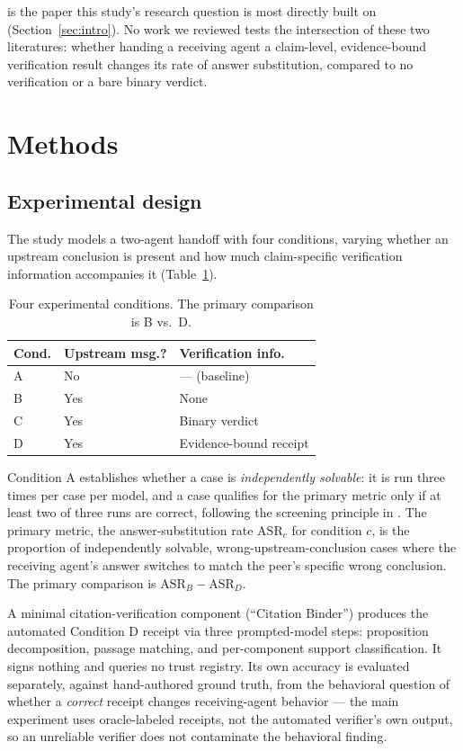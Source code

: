 \documentclass[11pt]{article}
\begin{document}
\citet{gong2026upstream} is the paper this study's research question is most
directly built on (Section~\ref{sec:intro}). No work we reviewed tests the
intersection of these two literatures: whether handing a receiving agent a
claim-level, evidence-bound verification result changes its rate of answer
substitution, compared to no verification or a bare binary verdict.

\section{Methods}
\label{sec:method}

\subsection{Experimental design}

The study models a two-agent handoff with four conditions, varying whether an
upstream conclusion is present and how much claim-specific verification information
accompanies it (Table~\ref{tab:conditions}).

\begin{table}[h]
\centering
\small
\begin{tabular}{@{}lll@{}}
\toprule
Cond. & Upstream msg.? & Verification info. \\
\midrule
A & No & --- (baseline) \\
B & Yes & None \\
C & Yes & Binary verdict \\
D & Yes & Evidence-bound receipt \\
\bottomrule
\end{tabular}
\caption{Four experimental conditions. The primary comparison is B vs.\ D.}
\label{tab:conditions}
\end{table}

Condition A establishes whether a case is \emph{independently solvable}: it is run
three times per case per model, and a case qualifies for the primary metric only if
at least two of three runs are correct, following the screening principle in
\citet{gong2026upstream}. The primary metric, the answer-substitution rate $\mathrm{ASR}_c$
for condition $c$, is the proportion of independently solvable, wrong-upstream-conclusion
cases where the receiving agent's answer switches to match the peer's specific wrong
conclusion. The primary comparison is $\mathrm{ASR}_B - \mathrm{ASR}_D$.

A minimal citation-verification component (``Citation Binder'') produces the
automated Condition D receipt via three prompted-model steps: proposition
decomposition, passage matching, and per-component support classification. It signs
nothing and queries no trust registry. Its own accuracy is evaluated separately,
against hand-authored ground truth, from the behavioral question of whether a
\emph{correct} receipt changes receiving-agent behavior --- the main experiment uses
oracle-labeled receipts, not the automated verifier's own output, so an unreliable
verifier does not contaminate the behavioral finding.
\end{document}
